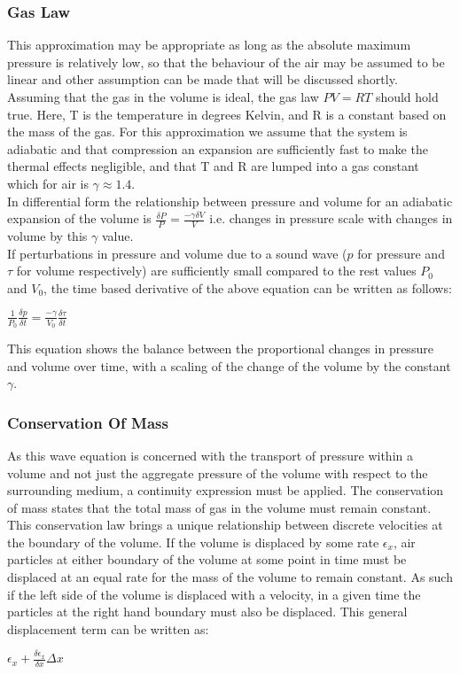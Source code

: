 \subsubsection{Gas Law}
This approximation may be appropriate as long as the absolute maximum pressure is relatively low, so that the behaviour of the air may be assumed to be linear and other assumption can be made that will be discussed shortly.\\
Assuming that the gas in the volume is ideal, the gas law $ PV = RT $ should hold true. Here, T is the temperature in degrees Kelvin, and R is a constant based on the mass of the gas. For this approximation we assume that the system is adiabatic and that compression an expansion are sufficiently fast to make the thermal effects negligible, and that T and R are lumped into a gas constant which for air is $\gamma \approx 1.4$.\\

In differential form the relationship between pressure and volume for an adiabatic expansion of the volume is $\frac{\delta P}{P} = \frac{-\gamma  \delta V}{V} $ i.e. changes in pressure scale with changes in volume by this $\gamma$ value.\\

If perturbations in pressure and volume due to a sound wave ($p$ for pressure and $\tau$ for volume respectively) are sufficiently small compared to the rest values $P_0$ and $V_0$, the time based derivative of the above equation can be written as follows: 
\begin{center}
$\frac{1}{P_0} \frac{\delta p}{\delta t} = \frac{-\gamma}{V_0} \frac{\delta \tau}{\delta t}$\\
\end{center}
This equation shows the balance between the proportional changes in pressure and volume over time, with a scaling of the change of the volume by the constant $\gamma$. \\
\subsubsection{Conservation Of Mass}
As this wave equation is concerned with the transport of pressure within a volume and not just the aggregate pressure of the volume with respect to the surrounding medium, a continuity expression must be applied. The conservation of mass states that the total mass of gas in the volume must remain constant. This conservation law brings a unique relationship between discrete velocities at the boundary of the volume. If the volume is displaced by some rate $\epsilon_x$, air particles at either boundary of the volume at some point in time must be displaced at an equal rate for the mass of the volume to remain constant. As such if the left side of the volume is displaced with a velocity, in a given time the particles at the right hand boundary must also be displaced. This general displacement term can be written as:
\begin{center}
 $\epsilon_x + \frac{\delta \epsilon_x}{\delta x} \Delta x$\\
\end{center}


